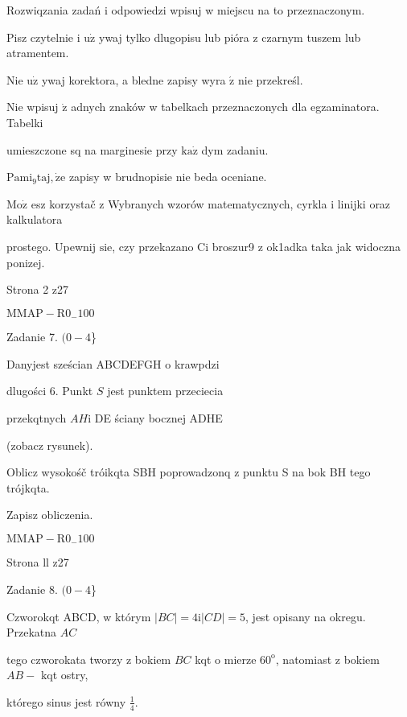 \documentclass[a4paper,12pt]{article}
\begin{document}
Rozwiqzania zadań i odpowiedzi wpisuj w miejscu na to przeznaczonym.

Pisz czytelnie i $\mathrm{u}\dot{\mathrm{z}}$ ywaj tylko dlugopisu lub pióra z czarnym tuszem lub atramentem.

Nie $\mathrm{u}\dot{\mathrm{z}}$ ywaj korektora, a bledne zapisy wyra $\acute{\mathrm{z}}$ nie przekreśl.

Nie wpisuj $\dot{\mathrm{z}}$ adnych znaków w tabelkach przeznaczonych dla egzaminatora. Tabelki

umieszczone sq na marginesie przy $\mathrm{k}\mathrm{a}\dot{\mathrm{z}}$ dym zadaniu.

$\mathrm{P}\mathrm{a}\mathrm{m}\mathrm{i}_{9}\mathrm{t}\mathrm{a}\mathrm{j}, \dot{\mathrm{z}}\mathrm{e}$ zapisy w brudnopisie nie beda oceniane.

$\mathrm{M}\mathrm{o}\dot{\mathrm{z}}$ esz korzystač z Wybranych wzorów matematycznych, cyrkla i linijki oraz kalkulatora

prostego. Upewnij $\mathrm{s}\mathrm{i}\mathrm{e}$, czy przekazano Ci broszur9 z ok1adka taka jak widoczna ponizej.

Strona 2 z27

$\mathrm{M}\mathrm{M}\mathrm{A}\mathrm{P}-\mathrm{R}0_{-}100$





Zadanie 7. $(0-4$\}

Danyjest sześcian ABCDEFGH o krawpdzi

dlugości 6. Punkt $S$ jest punktem przeciecia

przekqtnych $AH \mathrm{i}$ DE ściany bocznej ADHE

(zobacz rysunek).

Oblicz wysokośč tróikqta SBH poprowadzonq z punktu S na bok BH tego trójkqta.

Zapisz obliczenia.

$\mathrm{M}\mathrm{M}\mathrm{A}\mathrm{P}-\mathrm{R}0_{-}100$

Strona ll z27





Zadanie 8. $(0-4$\}

Czworokqt ABCD, w którym $|BC|=4 \mathrm{i} |CD|=5$, jest opisany na okregu. Przekatna $AC$

tego czworokata tworzy z bokiem $BC$ kqt o mierze $60^{\mathrm{o}}$, natomiast z bokiem $AB-$ kqt ostry,

którego sinus jest równy $\displaystyle \frac{1}{4}.$
\end{document}
